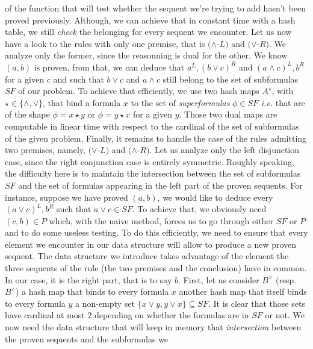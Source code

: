 \documentclass[a4paper, 11pt]{article}
\newcommand{\ie}{ \textit{i.e.} }
\begin{document}
    of the function that will test whether the sequent we're trying to add hasn't been proved previously.
    Although, we can achieve that in constant time with a hash table, we still \textit{check} the 
    belonging for every sequent we encounter. %
    Let us now have a look to the rules with only
    one premise, that is $(\wedge$-$L)$ and $(\vee$-$R)$. We analyze only the former, since the 
    reasonning is dual for the other. We know $(a,b)$ is proven, from that, we can deduce that 
    $a^L,(b\vee c)^R$ and 
    $(a\wedge c)^L,b^R$ for a given $c$ and such that $b\vee c$ and $a\wedge c$ still belong to the set 
    of subformulas $SF$ of our problem. To achieve that efficiently, we use two hash maps $A^\star$,
    with $\star\in\{\wedge,\vee\}$, that bind a formula $x$ to the set of \textit{superformulas} 
    $\phi\in SF$ \ie that are of the shape $\phi=x\star y$ or $\phi=y\star x$ for a given $y$. 
    Those two dual maps are computable in linear time
    with respect to the cardinal of the set of subformulas of the given problem. Finally, it remains to
    handle the case of the rules admitting two premises, namely, $(\vee$-$L)$ and $(\wedge$-$R)$. Let us
    analyze only the left disjunction case, since the right conjunction case is entirely symmetric. 
    Roughly
    speaking, the difficulty here is to maintain the intersection between the set of subformulas $SF$
    and the set of formulas appearing in the left part of the proven sequents. For instance, suppose
    we have proved $(a,b)$, we would like to deduce every $(a\vee c)^L,b^R$ such that $a\vee c\in SF$.
    To achieve that, we obviously need $(c,b)\in P$ which, with the naive method, forces us to go through
    either $SF$ or $P$ and to do some useless testing. To do this efficiently, we need to ensure that
    every element we encounter in our data structure will allow to produce a new proven sequent. The
    data structure we introduce takes advantage of the element the three sequents of the rule
    (the two premises and the conclusion) have in common. In our case, it is the right part, that is to 
    say $b$. First, let us consider $B^\vee$ (resp. $B^\wedge$) a hash map that binds to every formula 
    $x$ another hash map that itself binds to every 
    formula $y$ a non-empty set $\{x\vee y,y\vee x\}\subseteq SF$. It is clear that those sets have 
    cardinal at 
    most $2$ depending on whether the formulas are in $SF$ or not. We now need the data structure that
    will keep in memory that \textit{intersection} between the proven sequents and the subformulas we
\end{document}
